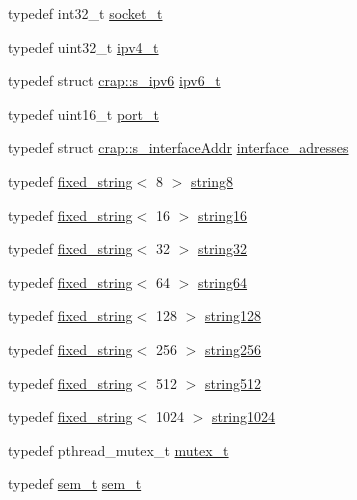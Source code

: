 \begin{DoxyCompactItemize}
\item 
typedef int32\+\_\+t \hyperlink{namespacecrap_af06d7d92e9405fc0750f74417541c2be}{socket\+\_\+t}
\item 
typedef uint32\+\_\+t \hyperlink{namespacecrap_a9ef32279067e77955c9f269926a331ee}{ipv4\+\_\+t}
\item 
typedef struct \hyperlink{structcrap_1_1s__ipv6}{crap\+::s\+\_\+ipv6} \hyperlink{namespacecrap_a73628169b6e7ba09cff516478c11b401}{ipv6\+\_\+t}
\item 
typedef uint16\+\_\+t \hyperlink{namespacecrap_a21d8c14ae6ca715c519ff369042149dd}{port\+\_\+t}
\item 
typedef struct \hyperlink{structcrap_1_1s__interface_addr}{crap\+::s\+\_\+interface\+Addr} \hyperlink{namespacecrap_af1dd6ce1461839e2d0d0b792fbd52e8a}{interface\+\_\+adresses}
\item 
typedef \hyperlink{classcrap_1_1fixed__string}{fixed\+\_\+string}$<$ 8 $>$ \hyperlink{namespacecrap_ac2aa8c51f82e95df485b8fff38837fcb}{string8}
\item 
typedef \hyperlink{classcrap_1_1fixed__string}{fixed\+\_\+string}$<$ 16 $>$ \hyperlink{namespacecrap_a6cff91a13d8be23072b3a0754c947caa}{string16}
\item 
typedef \hyperlink{classcrap_1_1fixed__string}{fixed\+\_\+string}$<$ 32 $>$ \hyperlink{namespacecrap_aed2599e591e7287057648c41883194c6}{string32}
\item 
typedef \hyperlink{classcrap_1_1fixed__string}{fixed\+\_\+string}$<$ 64 $>$ \hyperlink{namespacecrap_a2b8a7358804e1a9c3c32f12d8cdcfdf8}{string64}
\item 
typedef \hyperlink{classcrap_1_1fixed__string}{fixed\+\_\+string}$<$ 128 $>$ \hyperlink{namespacecrap_a6d163720fa009acb153550f4486ff6da}{string128}
\item 
typedef \hyperlink{classcrap_1_1fixed__string}{fixed\+\_\+string}$<$ 256 $>$ \hyperlink{namespacecrap_af674ac1cc38a09c563c68dfc3b15e554}{string256}
\item 
typedef \hyperlink{classcrap_1_1fixed__string}{fixed\+\_\+string}$<$ 512 $>$ \hyperlink{namespacecrap_a52392ad28972b8b96725b2f7928d38fa}{string512}
\item 
typedef \hyperlink{classcrap_1_1fixed__string}{fixed\+\_\+string}$<$ 1024 $>$ \hyperlink{namespacecrap_acbceaa050a351b36f8b29129f49621c1}{string1024}
\item 
typedef pthread\+\_\+mutex\+\_\+t \hyperlink{namespacecrap_a1a552340e5d6bb679ebde38c74a802a8}{mutex\+\_\+t}
\item 
typedef \hyperlink{namespacecrap_a8389bdde2ea5b1b5884c12d7f82c0e39}{sem\+\_\+t} \hyperlink{namespacecrap_a8389bdde2ea5b1b5884c12d7f82c0e39}{sem\+\_\+t}

\end{DoxyCompactItemize}
